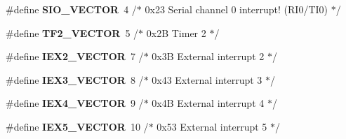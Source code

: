 \begin{DoxyCompactItemize}
\#define {\bf S\+I\+O\+\_\+\+V\+E\+C\+T\+OR}~4  /$\ast$ 0x23 Serial channel 0 interrupt! (\+R\+I0/\+T\+I0) $\ast$/
\item 
\#define {\bf T\+F2\+\_\+\+V\+E\+C\+T\+OR}~5  /$\ast$ 0x2\+B Timer 2 $\ast$/
\item 
\#define {\bf I\+E\+X2\+\_\+\+V\+E\+C\+T\+OR}~7    /$\ast$ 0x3\+B External interrupt 2 $\ast$/
\item 
\#define {\bf I\+E\+X3\+\_\+\+V\+E\+C\+T\+OR}~8    /$\ast$ 0x43 External interrupt 3 $\ast$/
\item 
\#define {\bf I\+E\+X4\+\_\+\+V\+E\+C\+T\+OR}~9    /$\ast$ 0x4\+B External interrupt 4 $\ast$/
\item 
\#define {\bf I\+E\+X5\+\_\+\+V\+E\+C\+T\+OR}~10   /$\ast$ 0x53 External interrupt 5 $\ast$/
\end{DoxyCompactItemize}
